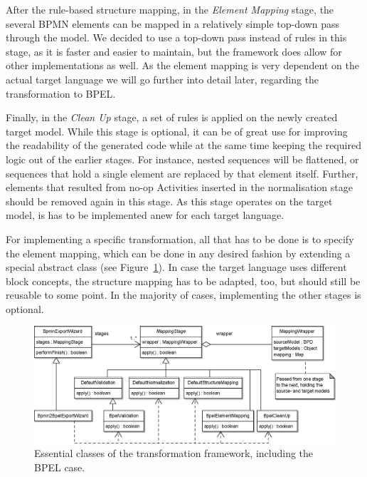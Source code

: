 After the rule-based structure mapping, in the \emph{Element Mapping} stage, the several BPMN elements can be mapped in a relatively simple top-down pass through the model.  We decided to use a top-down pass instead of rules in this stage, as it is faster and easier to maintain, but the framework does allow for other implementations as well.  As the element mapping is very dependent on the actual target language we will go further into detail later, regarding the transformation to BPEL.

Finally, in the \emph{Clean Up} stage, a set of rules is applied on the newly created target model.  While this stage is optional, it can be of great use for improving the readability of the generated code while at the same time keeping the required logic out of the earlier stages.  For instance, nested sequences will be flattened, or sequences that hold a single element are replaced by that element itself.  Further, elements that resulted from no-op Activities inserted in the normalisation stage should be removed again in this stage.  As this stage operates on the target model, is has to be implemented anew for each target language.

For implementing a specific transformation, all that has to be done is to specify the element mapping, which can be done in any desired fashion by extending a special abstract class (see Figure~\ref{fig:trafo_framework}). In case the target language uses different block concepts, the structure mapping has to be adapted, too, but should still be reusable to some point.  In the majority of cases, implementing the other stages is optional.

\begin{figure}%
	\centering
	\includegraphics[width=\textwidth]{img/trafoframework.png}
	\caption{Essential classes of the transformation framework, including the BPEL case.}
	\label{fig:trafo_framework}
\end{figure}




